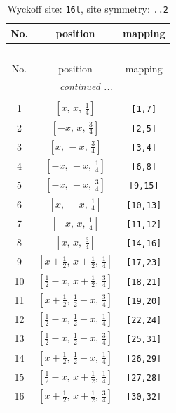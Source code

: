\documentclass[fleqn,8pt]{jsarticle}
\begin{document}
\renewcommand{\arraystretch}{1.2}
\begin{longtable}{ccc}
\caption{Wyckoff site: {\tt 16l}, site symmetry: {\tt ..2}}
 \\
 \hline \hline
No. & position & mapping \\ \hline \endfirsthead

\multicolumn{2}{l}{\tablename\ \thetable{}} \\
 \hline \hline
No. & position & mapping \\ \hline \endhead

 \hline \hline
\multicolumn{2}{r}{\footnotesize\it continued ...} \\ \endfoot

 \hline \hline
\multicolumn{2}{r}{} \\ \endlastfoot

1 & $\left[ x,\, x,\, \frac{1}{4} \right]$ & {\tt [1,7]} \\ \hline
2 & $\left[ - x,\, x,\, \frac{3}{4} \right]$ & {\tt [2,5]} \\ \hline
3 & $\left[ x,\, - x,\, \frac{3}{4} \right]$ & {\tt [3,4]} \\ \hline
4 & $\left[ - x,\, - x,\, \frac{1}{4} \right]$ & {\tt [6,8]} \\ \hline
5 & $\left[ - x,\, - x,\, \frac{3}{4} \right]$ & {\tt [9,15]} \\ \hline
6 & $\left[ x,\, - x,\, \frac{1}{4} \right]$ & {\tt [10,13]} \\ \hline
7 & $\left[ - x,\, x,\, \frac{1}{4} \right]$ & {\tt [11,12]} \\ \hline
8 & $\left[ x,\, x,\, \frac{3}{4} \right]$ & {\tt [14,16]} \\ \hline
9 & $\left[ x + \frac{1}{2},\, x + \frac{1}{2},\, \frac{1}{4} \right]$ & {\tt [17,23]} \\ \hline
10 & $\left[ \frac{1}{2} - x,\, x + \frac{1}{2},\, \frac{3}{4} \right]$ & {\tt [18,21]} \\ \hline
11 & $\left[ x + \frac{1}{2},\, \frac{1}{2} - x,\, \frac{3}{4} \right]$ & {\tt [19,20]} \\ \hline
12 & $\left[ \frac{1}{2} - x,\, \frac{1}{2} - x,\, \frac{1}{4} \right]$ & {\tt [22,24]} \\ \hline
13 & $\left[ \frac{1}{2} - x,\, \frac{1}{2} - x,\, \frac{3}{4} \right]$ & {\tt [25,31]} \\ \hline
14 & $\left[ x + \frac{1}{2},\, \frac{1}{2} - x,\, \frac{1}{4} \right]$ & {\tt [26,29]} \\ \hline
15 & $\left[ \frac{1}{2} - x,\, x + \frac{1}{2},\, \frac{1}{4} \right]$ & {\tt [27,28]} \\ \hline
16 & $\left[ x + \frac{1}{2},\, x + \frac{1}{2},\, \frac{3}{4} \right]$ & {\tt [30,32]} \\
\end{longtable}
\end{document}
